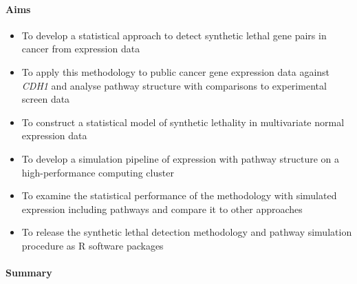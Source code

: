 \paragraph{Aims}

  \begin{itemize}
   \item To develop a statistical approach to detect synthetic lethal gene pairs in cancer from expression data

   \bigskip
   
   \item To apply this methodology to public cancer gene expression data against \textit{CDH1} and analyse pathway structure with comparisons to experimental screen data

   \bigskip
   
   \item To construct a statistical model of synthetic lethality in multivariate normal expression data
 
   \bigskip
   
   \item To develop a simulation pipeline of expression with pathway structure on a high-performance computing cluster 

   \bigskip
   
   \item To examine the statistical performance of the methodology with simulated expression including pathways and compare it to other approaches

   \bigskip
   
   \item To release the synthetic lethal detection methodology and pathway simulation procedure as R software packages
   
  \end{itemize}
  
 \paragraph{Summary}
 
